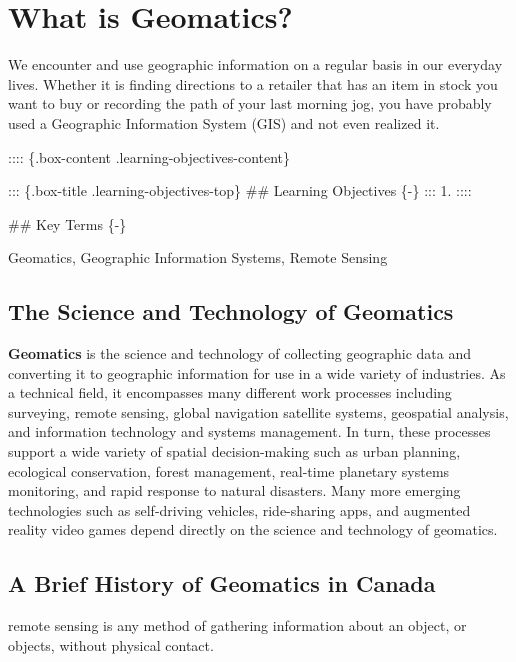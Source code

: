 \documentclass[
]{book}
\begin{document}
\hypertarget{what-is-geomatics}{%
\chapter{What is Geomatics?}\label{what-is-geomatics}}

We encounter and use geographic information on a regular basis in our everyday lives. Whether it is finding directions to a retailer that has an item in stock you want to buy or recording the path of your last morning jog, you have probably used a Geographic Information System (GIS) and not even realized it.

:::: \{.box-content .learning-objectives-content\}

::: \{.box-title .learning-objectives-top\}
\#\# Learning Objectives \{-\}
:::
1.
::::

\#\# Key Terms \{-\}

Geomatics, Geographic Information Systems, Remote Sensing

\hypertarget{the-science-and-technology-of-geomatics}{%
\section{The Science and Technology of Geomatics}\label{the-science-and-technology-of-geomatics}}

\textbf{Geomatics} is the science and technology of collecting geographic data and converting it to geographic information for use in a wide variety of industries. As a technical field, it encompasses many different work processes including surveying, remote sensing, global navigation satellite systems, geospatial analysis, and information technology and systems management. In turn, these processes support a wide variety of spatial decision-making such as urban planning, ecological conservation, forest management, real-time planetary systems monitoring, and rapid response to natural disasters. Many more emerging technologies such as self-driving vehicles, ride-sharing apps, and augmented reality video games depend directly on the science and technology of geomatics.

\hypertarget{a-brief-history-of-geomatics-in-canada}{%
\section{A Brief History of Geomatics in Canada}\label{a-brief-history-of-geomatics-in-canada}}

remote sensing is any method of gathering information about an object, or objects, without physical contact.
\end{document}
